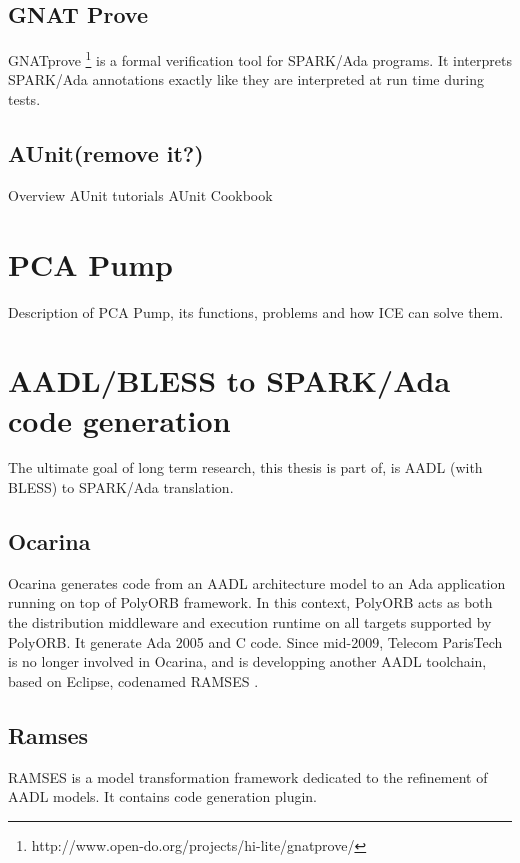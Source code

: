 \subsection{GNAT Prove}
\label{background:spark:gnatprove}
GNATprove \footnote{http://www.open-do.org/projects/hi-lite/gnatprove/} is a formal verification tool for SPARK/Ada programs. It interprets SPARK/Ada annotations exactly like they are interpreted at run time during tests.


\subsection{AUnit(remove it?)}
\label{background:spark:aunit}
Overview
AUnit tutorials \cite{AUnitTutorials:Online}
AUnit Cookbook \cite{AUnitCookbook:Online}



\section{PCA Pump}
\label{background:pcapump}
Description of PCA Pump, its functions, problems and how ICE can solve them.


\section{AADL/BLESS to SPARK/Ada code generation}
\label{background:codegen}
The ultimate goal of long term research, this thesis is part of, is AADL (with BLESS) to SPARK/Ada translation.


\subsection{Ocarina}
\label{background:codegen:ocarina}
Ocarina \cite{Ocarina:Paper,Ocarina:Paper} generates code from an AADL architecture model to an Ada application running on top of PolyORB framework. In this context, PolyORB acts as both the distribution middleware and execution runtime on all targets supported by PolyORB.
It generate Ada 2005 and C code.
Since mid-2009, Telecom ParisTech is no longer involved in Ocarina, and is developping another AADL toolchain, based on Eclipse, codenamed RAMSES \cite{Ocarina:About:Online}.


\subsection{Ramses}
\label{background:codegen:ramses}
RAMSES is a model transformation framework dedicated to the refinement of AADL models. It contains code generation plugin.
